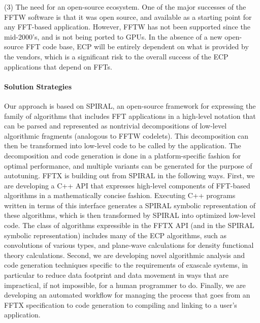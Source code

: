 {\begin{trivlist}
\item
(3)
The need for an open-source ecosystem. One of the major successes of the FFTW software is that it was open source, and available as a starting point for any FFT-based application. However, FFTW has not been supported since the mid-2000's, and is not being ported to GPUs. In the absence of a new open-source FFT code base, ECP will be entirely dependent on what is provided by the vendors, which is a significant risk to the overall success of the ECP applications that depend on FFTs. 
\end{trivlist}

\paragraph{Solution Strategies}
Our approach is based on SPIRAL, an open-source framework for expressing the family of algorithms that includes FFT applications in a high-level notation that can be parsed and represented as nontrivial decompositions of low-level algorithmic fragments (analogous to FFTW codelets). This decomposition can then be transformed into low-level code to be called by the application. The decomposition and code generation is done in a platform-specific fashion for optimal performance, and multiple variants can be generated for the purpose of autotuning.
FFTX is building out from SPIRAL in the following ways.
First, we are developing a C++ API that expresses high-level components of FFT-based algorithms in a mathematically concise fashion. Executing C++ programs written in terms of this interface generates a SPIRAL symbolic representation of these algorithms, which is then transformed by SPIRAL into optimized low-level code. The class of algorithms expressible in the FFTX API (and in the SPIRAL symbolic representation) includes many of the ECP algorithms, such as convolutions of various types, and plane-wave calculations for density functional theory calculations. Second, we are developing novel algorithmic analysis and code generation techniques specific to the requirements of exascale systems, in particular to reduce data footprint and data movement in ways that are impractical, if not impossible, for a human programmer to do. Finally, we are developing an automated workflow for managing the process that goes from an FFTX specification to code generation to compiling and linking to a user's application. 

}
